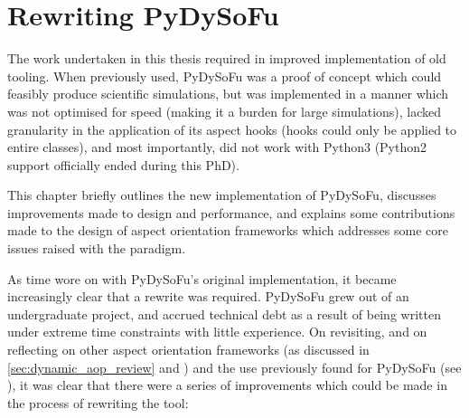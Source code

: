 \chapter{Rewriting PyDySoFu}\label{chap:pdsf_rewrite}


The work undertaken in this thesis required in improved implementation of old
tooling. When previously used, PyDySoFu was a proof of concept which could
feasibly produce scientific simulations, but was implemented in a manner which
was not optimised for speed (making it a burden for large simulations), lacked
granularity in the application of its aspect hooks (hooks could only be applied
to entire classes), and most importantly, did not work with Python3 (Python2
support officially ended during this PhD). 

This chapter briefly outlines the new implementation of PyDySoFu, discusses
improvements made to design and performance, and explains some contributions
made to the design of aspect orientation frameworks which addresses some core
issues raised with the paradigm. 



As time wore on with PyDySoFu's original implementation, it became increasingly
clear that a rewrite was required. PyDySoFu grew out of an undergraduate
project, and accrued technical debt as a result of being written under extreme
time constraints with little experience. On revisiting, and on reflecting on
other aspect orientation frameworks (as discussed in
\cref{sec:dynamic_aop_review} and \cite{dynamicAOchitchyan}) and the use
previously found for PyDySoFu (see \cite{wallis2018caise, wallis2018genetic}),
it was clear that there were a series of improvements which could be made in the
process of rewriting the tool:

